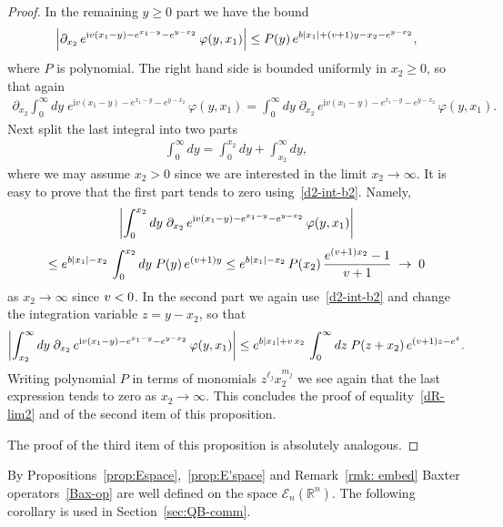 \documentclass[11pt]{article}
\numberwithin{equation}{section}
\theoremstyle{plain}
\theoremstyle{definition}
\let\Im\relax
\DeclareMathOperator{\Im}{Im}
\renewcommand{\phi}{\varphi}
\renewcommand{\imath}{\mathrm{i}}
\begin{document}
\begin{proof}
	In the remaining $y \geq 0$ part we have the bound
	\begin{align}\label{d2-int-b2}
		\Bigl| \partial_{x_2} \, e^{ \imath v(x_1 - y) - e^{x_1 - y} - e^{y - x_2} } \, \phi(y, x_1)  \Bigr| \leq P(y) \, e^{b|x_1| + (\Im v + 1) y - x_2 - e^{y - x_2}},
	\end{align}
	where $P$ is polynomial. The right hand side is bounded uniformly in $x_2 \geq 0$, so that again
	\begin{align}
		\partial_{x_2}  \int_{0}^\infty dy \; e^{ \imath v(x_1 - y) - e^{x_1 - y} - e^{y - x_2} } \, \phi(y, x_1) = \int_{0}^\infty dy \; \partial_{x_2}  \, e^{ \imath v(x_1 - y) - e^{x_1 - y} - e^{y - x_2} } \, \phi(y, x_1) .
	\end{align}
	Next split the last integral into two parts
	\begin{align}
		\int_0^\infty dy = \int_0^{x_2} dy + \int_{x_2}^\infty dy,
	\end{align}
	where we may assume $x_2 > 0$ since we are interested in the limit $x_2 \to \infty$. It is easy to prove that the first part tends to zero using~\eqref{d2-int-b2}. Namely,
	\begin{multline}
		\biggl| \int_{0}^{x_2} dy \; \partial_{x_2}  \, e^{ \imath v(x_1 - y) - e^{x_1 - y} - e^{y - x_2} } \, \phi(y, x_1) \biggr| \\[3pt]
		\leq e^{b|x_1| - x_2} \, \int_0^{x_2} dy \; P(y) \, e^{(\Im v + 1) y} \leq e^{b|x_1| - x_2} \, P(x_2) \, \frac{e^{(\Im v + 1)x_2} - 1}{\Im v + 1} \; \to \; 0
	\end{multline}
	as $x_2 \to \infty$ since $\Im v < 0$. In the second part we again use~\eqref{d2-int-b2} and change the integration variable $z = y - x_2$, so that
	\begin{align}
		\biggl| \int_{x_2}^{\infty} dy \; \partial_{x_2}  \, e^{ \imath v(x_1 - y) - e^{x_1 - y} - e^{y - x_2} } \, \phi(y, x_1) \biggr|  \leq e^{b | x_1| + \Im v \, x_2} \, \int_0^\infty dz \; P(z + x_2) \, e^{(\Im v + 1)z - e^{z}}.
	\end{align}
	Writing polynomial $P$ in terms of monomials $z^{\ell_j} x_2^{m_j}$ we see again that the last expression tends to zero as $x_2 \to \infty$. This concludes the proof of equality~\eqref{dR-lim2} and of the second item of this proposition.
	
	The proof of the third item of this proposition is absolutely analogous.
\end{proof}

By Propositions~\ref{prop:Espace},~\ref{prop:E'space} and Remark~\ref{rmk: embed} Baxter operators~\eqref{Bax-op} are well defined on the space $\mathcal{E}_n(\mathbb{R}^n)$. The following corollary is used in Section~\ref{sec:QB-comm}.
\end{document}
